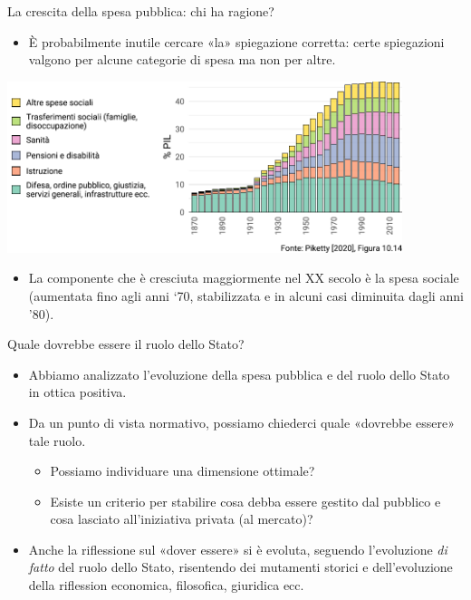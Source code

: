\documentclass[aspectratio=64,12pt]{beamer}
\begin{document}
\begin{frame}{La crescita della spesa pubblica: chi ha ragione?}
\begin{itemize}
\item È probabilmente inutile cercare «la» spiegazione corretta: certe spiegazioni valgono per alcune categorie di spesa ma non per altre.
\end{itemize}

\begin{center}
\includegraphics[height=5cm]{./figure/evoluzione-spesa-Piketty-color.pdf}
\end{center}
\vspace{-3mm}

\begin{itemize}
\item La componente che è cresciuta maggiormente nel XX secolo è la spesa sociale (aumentata fino agli anni ‘70, stabilizzata e in alcuni casi diminuita dagli anni '80).
\end{itemize}
\end{frame}

\begin{frame}{Quale dovrebbe essere il ruolo dello Stato?}
\begin{itemize}
\item Abbiamo analizzato l’evoluzione della spesa pubblica e del ruolo dello Stato in ottica \alert{positiva}.
\item Da un punto di vista \alert{normativo}, possiamo chiederci quale «dovrebbe essere» tale ruolo.
  \begin{itemize}
  \item Possiamo individuare una dimensione ottimale?
  \item Esiste un criterio per stabilire cosa debba essere gestito dal pubblico e cosa lasciato all’iniziativa privata (al mercato)?
\end{itemize}
\item Anche la riflessione sul «dover essere» si è evoluta, seguendo l’evoluzione \emph{di fatto} del ruolo dello Stato, risentendo dei mutamenti storici e dell’evoluzione della riflession economica, filosofica, giuridica ecc.
\end{itemize}
\end{frame}
\end{document}

